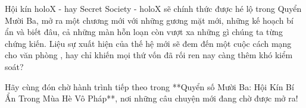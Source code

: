 \documentclass[main.tex]{subfiles}
\begin{document}
Hội kín holoX - hay Secret Society - holoX sẽ chính thức được hé lộ trong Quyển Mười Ba, mở ra một chương mới với những gương mặt mới, những kế hoạch bí ẩn và biết đâu, cả những màn hỗn loạn còn vượt xa những gì chúng ta từng chứng kiến. Liệu sự xuất hiện của thế hệ mới sẽ đem đến một cuộc cách mạng cho văn phòng \hll, hay chỉ khiến mọi thứ vốn đã rối ren nay càng thêm khó kiểm soát?

Hãy cùng đón chờ hành trình tiếp theo trong **Quyển số Mười Ba: Hội Kín Bí Ẩn Trong Mùa Hè Vô Pháp**, nơi những câu chuyện mới đang chờ được mở ra!
\end{document}
